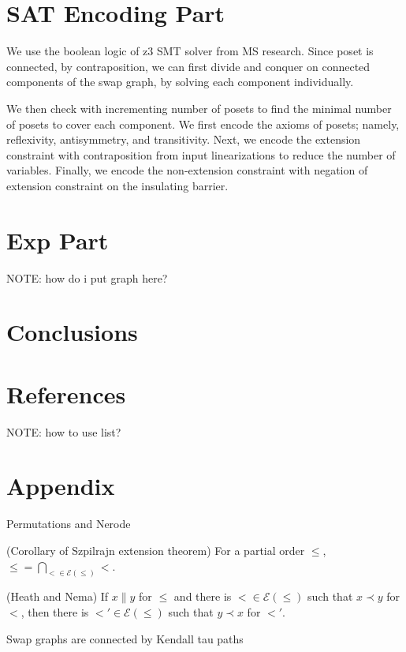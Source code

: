 \documentclass{llncs}
\begin{document}
\section{SAT Encoding Part}
We use the boolean logic of z3 SMT solver from MS research. Since poset is connected, by contraposition, we can first divide and conquer on connected components of the swap graph, by solving each component individually.

We then check with incrementing number of posets to find the minimal number of posets to cover each component. We first encode the axioms of posets; namely, reflexivity, antisymmetry, and transitivity. Next, we encode the extension constraint with contraposition from input linearizations to reduce the number of variables. Finally, we encode the non-extension constraint with negation of extension constraint on the insulating barrier.

\section{Exp Part}
NOTE: how do i put graph here?

\section{Conclusions}

\section{References}
NOTE: how to use list?

\section{Appendix}

\begin{theorem}
    Permutations and Nerode
\end{theorem}

\begin{theorem}
    (Corollary of Szpilrajn extension theorem) For a partial order $\leq$, $\leq = \bigcap_{< \in \mathcal{E}(\leq)} <$.
\end{theorem}

\begin{theorem}
    (Heath and Nema) If $x \parallel y$ for $\leq$ and there is $< \in \mathcal{E}(\leq)$ such that $x \prec y$ for $<$, then there is $<' \in \mathcal{E}(\leq)$ such that $y \prec x$ for $<'$.
\end{theorem}

\begin{theorem}
    Swap graphs are connected by Kendall tau paths
\end{theorem}
\end{document}

